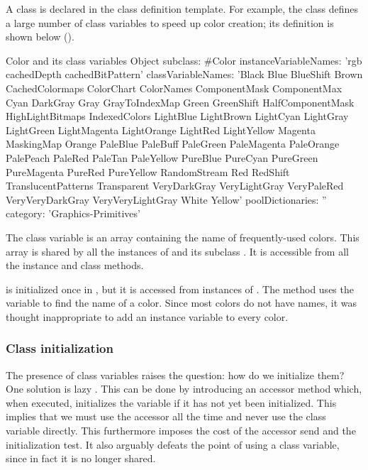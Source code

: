 \documentclass[a4paper,10pt,twoside]{book}
\begin{document}
A class  is declared in the class definition template.
For example, the class  defines a large number of class variables to speed up color creation; its definition is shown below ().

\begin{classdef}[Color]{Color and its class variables}
Object subclass: #Color 	
        instanceVariableNames: 'rgb cachedDepth cachedBitPattern'
        classVariableNames: 'Black Blue BlueShift Brown CachedColormaps ColorChart ColorNames ComponentMask ComponentMax Cyan DarkGray Gray GrayToIndexMap Green GreenShift HalfComponentMask HighLightBitmaps IndexedColors LightBlue LightBrown LightCyan LightGray LightGreen LightMagenta LightOrange LightRed LightYellow Magenta MaskingMap Orange PaleBlue PaleBuff PaleGreen PaleMagenta PaleOrange PalePeach PaleRed PaleTan PaleYellow PureBlue PureCyan PureGreen PureMagenta PureRed PureYellow RandomStream Red RedShift TranslucentPatterns Transparent VeryDarkGray VeryLightGray VeryPaleRed VeryVeryDarkGray VeryVeryLightGray White Yellow'
        poolDictionaries: '' 	
        category: 'Graphics-Primitives'
\end{classdef}

The class variable  is an array containing the name of frequently-used colors. This array is shared by all the instances of  and its subclass . It is accessible from all the instance and class methods. %

 is initialized once in , but it is accessed from instances of .
The method  uses the variable to find the name of a color.
Since most colors do not have names, it was thought inappropriate to add an instance variable  to every color.

\subsubsection{Class initialization}

The presence of class variables raises the question: how do we initialize them?  
One solution is lazy .
This can be done by introducing an accessor method which, when executed, initializes the variable if it has not yet been initialized. This implies that we must use the accessor all the time and never use the class variable directly.  This furthermore imposes the cost of the accessor send and the initialization test.
It also arguably defeats the point of using a class variable, since in fact it is no longer shared.
\end{document}
